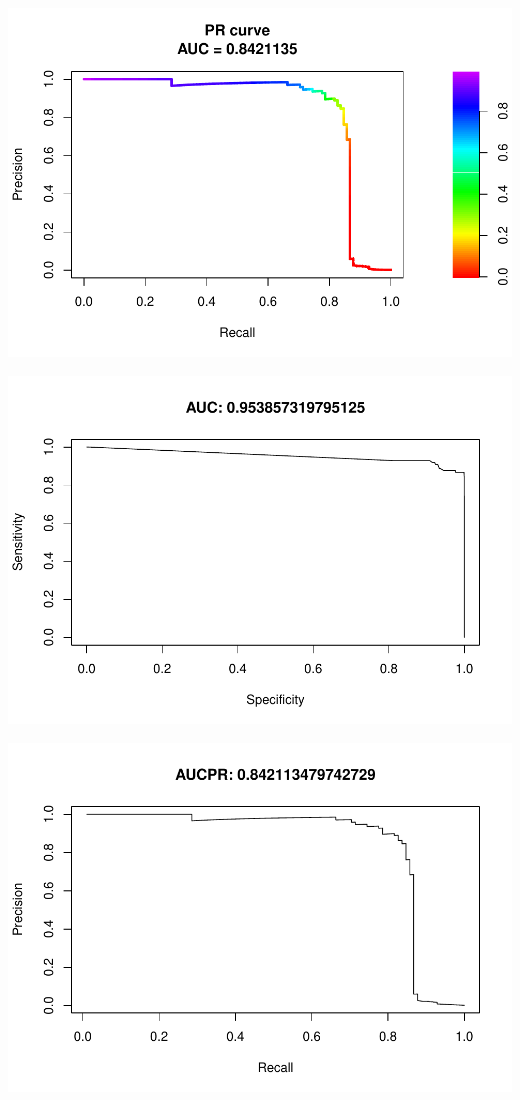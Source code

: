 \documentclass[]{article}
\begin{document}
\begin{center}\includegraphics{Credit_Card_Fraud_Detection_Project_Report_files/figure-latex/unnamed-chunk-21-3} \end{center}

\begin{center}\includegraphics{Credit_Card_Fraud_Detection_Project_Report_files/figure-latex/unnamed-chunk-21-4} \end{center}

\begin{center}\includegraphics{Credit_Card_Fraud_Detection_Project_Report_files/figure-latex/unnamed-chunk-21-5} \end{center}
\end{document}
